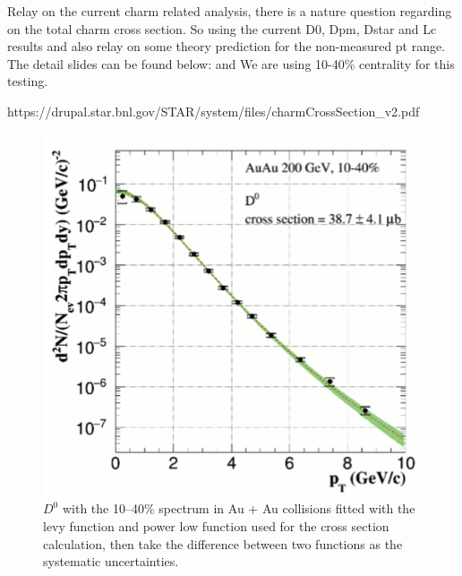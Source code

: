 Relay on the current charm related analysis, there is a nature question regarding on the total charm cross section. So using the current D0, Dpm, Dstar and Lc results and also relay on some theory prediction for the non-measured pt range. The detail slides can be found below: and We are using 10-40\% centrality for this testing.

https://drupal.star.bnl.gov/STAR/system/files/charmCrossSection\_v2.pdf


\begin{figure}[htbp]
\begin{minipage}[htbp]{0.47\linewidth}
\centering
\includegraphics[width=1.0\textwidth,angle=0]{figure/Run14_D0HFT/ccx_1.png}
\caption{$D^{0}$ with the 10--40\% spectrum in Au + Au collisions fitted with the levy function and power low function used for the cross section calculation, then take the difference between two functions as the systematic uncertainties. \label{ccx_1}}
\end{minipage}
\hfill
\begin{minipage}[htbp]{0.47\linewidth}
\centering

\end{minipage}
\end{figure}
